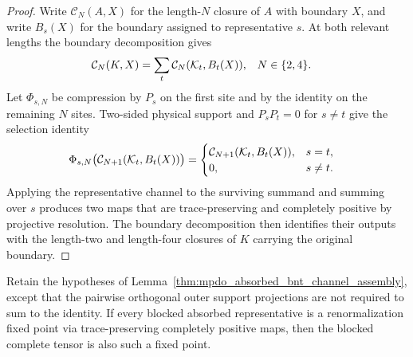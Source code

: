\begin{proof}\leanok
    Write $\mathcal C_N(A,X)$ for the length-$N$ closure of $A$ with boundary
    $X$, and write $B_s(X)$ for the boundary assigned to representative $s$.
    At both relevant lengths the boundary decomposition gives
    \begin{align}
        \mathcal C_N(K,X)
         & =\sum_t \mathcal C_N(\mathcal K_t,B_t(X)),
         & N                                          & \in\{2,4\}.
        \notag
    \end{align}
    Let $\Phi_{s,N}$ be compression by $P_s$ on the first site and by the
    identity on the remaining $N$ sites. Two-sided physical support and
    $P_sP_t=0$ for $s\ne t$ give the selection identity
    \begin{align}
        \Phi_{s,N}\bigl(\mathcal C_{N+1}(\mathcal K_t,B_t(X))\bigr)
         & =
        \begin{cases}
            \mathcal C_{N+1}(\mathcal K_t,B_t(X)), & s=t,    \\
            0,                                     & s\ne t.
        \end{cases}
        \notag
    \end{align}
    Applying the representative channel to the surviving summand and summing
    over $s$ produces two maps that are trace-preserving and completely
    positive by projective resolution. The boundary decomposition then
    identifies their outputs with the length-two and length-four closures of
    $K$ carrying the original boundary.
\end{proof}

\begin{lemma}
    \label{thm:mpdo_absorbed_bnt_channel_support_completion}
    \leanok
    Retain the hypotheses of
    Lemma~\ref{thm:mpdo_absorbed_bnt_channel_assembly}, except that the
    pairwise orthogonal outer support projections are not required to sum to
    the identity. If every blocked absorbed representative is a
    renormalization fixed point via trace-preserving completely positive maps,
    then the blocked complete tensor is also such a fixed point.
\end{lemma}

